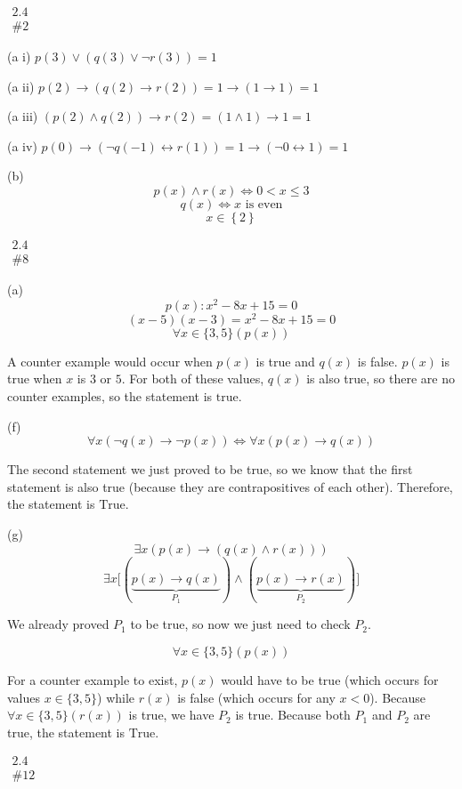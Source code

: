 \documentclass{article}
\newcommand{\T}{1}
\newcommand{\F}{0}
\newcommand{\problem}[2]{$\boxed{\begin{array}{l}\text{#1} \\ \text{\##2}\end{array}}$}
\newcommand{\subproblem}[1]{(#1)}
\begin{document}
\begin{multicols*}{2}

\problem{2.4}{2}

\subproblem{a i} $p(3)\vee(q(3)\vee\neg r(3)) = \boxed{\T}$

\subproblem{a ii} $p(2)\rightarrow(q(2)\rightarrow r(2)) = \T\rightarrow(\T\rightarrow\T) = \boxed{\T}$

\subproblem{a iii} $(p(2)\wedge q(2))\rightarrow r(2) = (\T\wedge\T)\rightarrow\T = \boxed{\T}$

\subproblem{a iv} $p(0)\rightarrow (\neg q(-1)\leftrightarrow r(1)) = \T\rightarrow(\neg \F\leftrightarrow\T) = \boxed{\T}$

\subproblem{b} \[
p(x)\wedge r(x) \Leftrightarrow 0 < x \le 3
\] \[
q(x)\Leftrightarrow \text{$x$ is even}
\] \[
\boxed{x\in\left\{2\right\}}
\]

%

\problem{2.4}{8}

\subproblem{a} \[
p(x): x^2-8x+15=0
\] \[
(x-5)(x-3)=x^2-8x+15=0
\] \[
\forall x\in\{3,5\}(p(x))
\]

A counter example would occur when $p(x)$ is true and $q(x)$ is
false. $p(x)$ is true when $x$ is $3$ or $5$. For both of these
values, $q(x)$ is also true, so there are no counter examples, so the
statement is $\boxed{\text{true}}$.

\subproblem{f} \[
\forall x(\neg q(x)\rightarrow\neg p(x)) \Leftrightarrow \forall x(p(x)\rightarrow q(x))
\]

The second statement we just proved to be true, so we know that the
first statement is also true (because they are contrapositives of each
other). Therefore, the statement is $\boxed{\text{True}}$.

\subproblem{g} \[
\exists x(p(x)\rightarrow (q(x)\wedge r(x)))
\] \[
\exists x\lbrack(\underbrace{p(x)\rightarrow q(x)}_{P_1})\wedge(\underbrace{p(x)\rightarrow r(x)}_{P_2})\rbrack
\]

We already proved $P_1$ to be true, so now we just need to check
$P_2$.

\[
\forall x\in\{3,5\}(p(x))
\]

For a counter example to exist, $p(x)$ would have to be true (which
occurs for values $x\in\{3,5\}$) while $r(x)$ is false (which occurs
for any $x<0$). Because $\forall x\in\{3,5\}(r(x))$ is true, we have
$P_2$ is true. Because both $P_1$ and $P_2$ are true, the statement is
$\boxed{\text{True}}$.

%

\problem{2.4}{12}


\end{multicols*}
\end{document}
